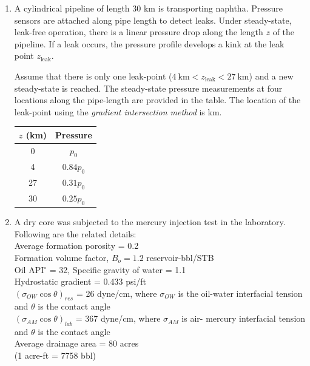\documentclass[journal,12pt,onecolumn]{IEEEtran}
\theoremstyle{remark}
\begin{document}
\begin{enumerate}
\hfill{}

\item A cylindrical pipeline of length 30 km is transporting naphtha. Pressure sensors are attached along pipe length to detect leaks. Under steady-state, leak-free operation, there is a linear pressure drop along the length $z$ of the pipeline. If a leak occurs, the pressure profile develops a kink at the leak point $z_{\text{leak}}$.


Assume that there is only one leak-point ($4~\text{km} < z_{\text{leak}} < 27~\text{km}$) and a new steady-state is reached. The steady-state pressure measurements at four locations along the pipe-length are provided in the table. The location of the leak-point using the \textit{gradient intersection method} is \underline{\hspace{2cm}} km.  

\hfill{}

\begin{tabular}{|c|c|}
\hline
$z$ (km) & Pressure \\
\hline
0 & $p_0$ \\
4 & $0.84p_0$ \\
27 & $0.31p_0$ \\
30 & $0.25p_0$ \\
\hline
\end{tabular}

\pagebreak

\item A dry core was subjected to the mercury injection test in the laboratory. Following are the related details: \\ 
Average formation porosity = 0.2 \\ 
Formation volume factor, $B_o = 1.2$ reservoir-bbl/STB \\ 
Oil API$^\circ$ = 32, Specific gravity of water = 1.1 \\ 
Hydrostatic gradient = 0.433 psi/ft \\ 
$(\sigma_{OW} \cos \theta)_{res}$ = 26 dyne/cm, where $\sigma_{OW}$ is the oil-water interfacial tension and $\theta$ is the contact angle \\ 
$(\sigma_{AM} \cos \theta)_{lab}$ = 367 dyne/cm, where $\sigma_{AM}$ is air- mercury interfacial tension and $\theta$ is the contact angle \\ 
Average drainage area = 80 acres \\ 
(1 acre-ft = 7758 bbl) \\ 


\end{enumerate}
\end{document}
